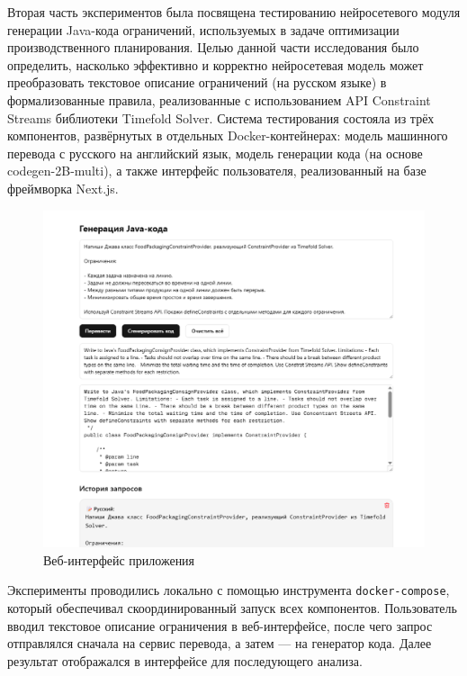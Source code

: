 Вторая часть экспериментов была посвящена тестированию нейросетевого модуля генерации Java-кода ограничений, используемых в задаче оптимизации производственного планирования. Целью данной части исследования было определить, насколько эффективно и корректно нейросетевая модель может преобразовать текстовое описание ограничений (на русском языке) в формализованные правила, реализованные с использованием API Constraint Streams библиотеки Timefold Solver. Система тестирования состояла из трёх компонентов, развёрнутых в отдельных Docker-контейнерах: модель машинного перевода с русского на английский язык, модель генерации кода (на основе codegen-2B-multi), а также интерфейс пользователя, реализованный на базе фреймворка Next.js.

\begin{figure}[ht]
    \centering
        \includegraphics[height = 16 cm, keepaspectratio]{../assets/images/tests/frontend.png}
		\caption{Веб-интерфейс приложения}
		\label{fig:frontend}
\end{figure}


Эксперименты проводились локально с помощью инструмента \texttt{docker-compose}, который обеспечивал скоординированный запуск всех компонентов. Пользователь вводил текстовое описание ограничения в веб-интерфейсе, после чего запрос отправлялся сначала на сервис перевода, а затем — на генератор кода. Далее результат отображался в интерфейсе для последующего анализа.

